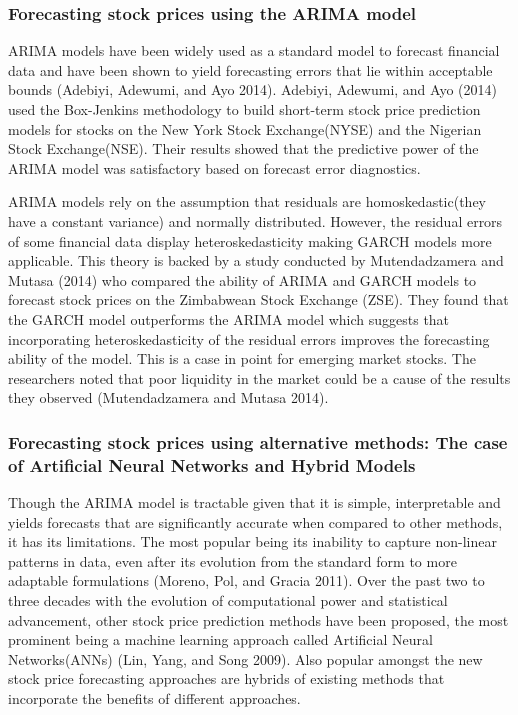\documentclass[12pt,a4paper]{article}
\numberwithin{equation}{section}
\numberwithin{figure}{section}
\numberwithin{table}{section}
\begin{document}
\subsubsection{Forecasting stock prices using the ARIMA
model}\label{forecasting-stock-prices-using-the-arima-model}

ARIMA models have been widely used as a standard model to forecast
financial data and have been shown to yield forecasting errors that lie
within acceptable bounds (Adebiyi, Adewumi, and Ayo 2014). Adebiyi,
Adewumi, and Ayo (2014) used the Box-Jenkins methodology to build
short-term stock price prediction models for stocks on the New York
Stock Exchange(NYSE) and the Nigerian Stock Exchange(NSE). Their results
showed that the predictive power of the ARIMA model was satisfactory
based on forecast error diagnostics.

ARIMA models rely on the assumption that residuals are
homoskedastic(they have a constant variance) and normally distributed.
However, the residual errors of some financial data display
heteroskedasticity making GARCH models more applicable. This theory is
backed by a study conducted by Mutendadzamera and Mutasa (2014) who
compared the ability of ARIMA and GARCH models to forecast stock prices
on the Zimbabwean Stock Exchange (ZSE). They found that the GARCH model
outperforms the ARIMA model which suggests that incorporating
heteroskedasticity of the residual errors improves the forecasting
ability of the model. This is a case in point for emerging market
stocks. The researchers noted that poor liquidity in the market could be
a cause of the results they observed (Mutendadzamera and Mutasa 2014).

\subsubsection{Forecasting stock prices using alternative methods: The
case of Artificial Neural Networks and Hybrid
Models}\label{forecasting-stock-prices-using-alternative-methods-the-case-of-artificial-neural-networks-and-hybrid-models}

Though the ARIMA model is tractable given that it is simple,
interpretable and yields forecasts that are significantly accurate when
compared to other methods, it has its limitations. The most popular
being its inability to capture non-linear patterns in data, even after
its evolution from the standard form to more adaptable formulations
(Moreno, Pol, and Gracia 2011). Over the past two to three decades with
the evolution of computational power and statistical advancement, other
stock price prediction methods have been proposed, the most prominent
being a machine learning approach called Artificial Neural
Networks(ANNs) (Lin, Yang, and Song 2009). Also popular amongst the new
stock price forecasting approaches are hybrids of existing methods that
incorporate the benefits of different approaches.
\end{document}
